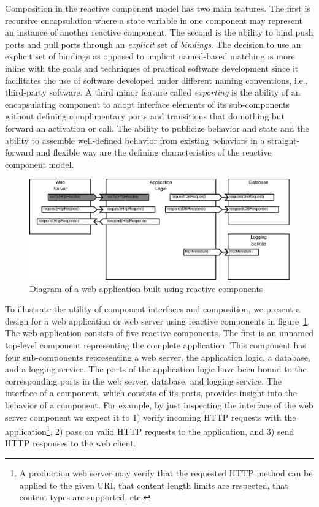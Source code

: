 Composition in the reactive component model has two main features.
The first is recursive encapsulation where a state variable in one component may represent an instance of another reactive component.
The second is the ability to bind push ports and pull ports through an \emph{explicit} set of \emph{bindings}.
The decision to use an explicit set of bindings as opposed to implicit named-based matching is more inline with the goals and techniques of practical software development since it facilitates the use of software developed under different naming conventions, i.e., third-party software.
A third minor feature called \emph{exporting} is the ability of an encapsulating component to adopt interface elements of its sub-components without defining complimentary ports and transitions that do nothing but forward an activation or call.
The ability to publicize behavior and state and the ability to assemble well-defined behavior from existing behaviors in a straight-forward and flexible way are the defining characteristics of the reactive component model.

\begin{figure}
\centering
\includegraphics[width=\textwidth]{web_server.eps}
\caption{Diagram of a web application built using reactive components\label{web_server}}
\end{figure}

To illustrate the utility of component interfaces and composition, we present a design for a web application or web server using reactive components in figure~\ref{web_server}.
The web application consists of five reactive components.
The first is an unnamed top-level component representing the complete application.
This component has four sub-components representing a web server, the application logic, a database, and a logging service.
The ports of the application logic have been bound to the corresponding ports in the web server, database, and logging service.
The interface of a component, which consists of its ports, provides insight into the behavior of a component.
For example, by just inspecting the interface of the web server component we expect it to 1) verify incoming HTTP requests with the application\footnote{A production web server may verify that the requested HTTP method can be applied to the given URI, that content length limits are respected, that content types are supported, etc.}, 2) pass on valid HTTP requests to the application, and 3) send HTTP responses to the web client.

